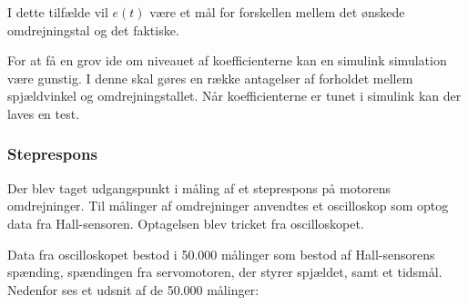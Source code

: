 I dette tilfælde vil $e(t)$ være et mål for forskellen mellem det ønskede omdrejningstal og det faktiske.

For at få en grov ide om niveauet af koefficienterne kan en simulink simulation være gunstig. I denne skal gøres en række antagelser af forholdet mellem spjældvinkel og omdrejningstallet. Når koefficienterne er tunet i simulink kan der laves en test.





\subsubsection{Steprespons}
\label{sec:steprespons}

Der blev taget udgangspunkt i måling af et steprespons på motorens omdrejninger. Til målinger af omdrejninger anvendtes et oscilloskop som optog data fra Hall-sensoren. Optagelsen blev tricket fra oscilloskopet.%

Data fra oscilloskopet bestod i 50.000 målinger som bestod af Hall-sensorens spænding, spændingen fra servomotoren, der styrer spjældet, samt et tidsmål. Nedenfor ses et udsnit af de 50.000 målinger:

